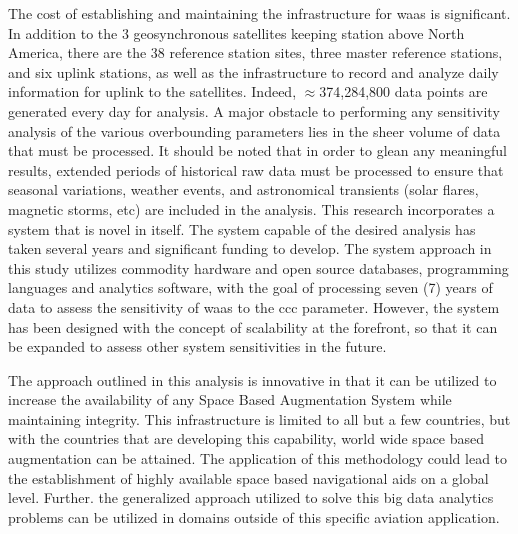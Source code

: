 The cost of establishing and maintaining the infrastructure for \ac{waas} is significant.  In addition to the 3 geosynchronous satellites keeping station above North America, there are the 38 reference station sites, three master reference stations, and six uplink stations, as well as the infrastructure to record and analyze daily information for uplink to the satellites.  Indeed, $\approx$374,284,800 data points are generated every day for analysis.  A major obstacle to performing any sensitivity analysis of the various overbounding parameters lies in the sheer volume of data that must be processed.  It should be noted that in order to glean any meaningful results, extended periods of historical raw data must be processed to ensure that seasonal variations, weather events, and astronomical transients (solar flares, magnetic storms, etc) are included in the analysis.  This research incorporates a system that is novel in itself.  The system capable of the desired analysis has taken several years and significant funding to develop. The system approach in this study utilizes commodity hardware and open source databases, programming languages and analytics software, with the goal of processing seven (7) years of data to assess the sensitivity of \ac{waas} to the \ac{ccc} parameter.  However, the system has been designed with the concept of scalability at the forefront, so that it can be expanded to assess other system sensitivities in the future.


The approach outlined in this analysis is innovative in that it can be utilized to increase the availability of any Space Based Augmentation System while maintaining integrity.  This infrastructure is limited to all but a few countries, but with the countries that are developing this capability, world wide space based augmentation can be attained. The application of this methodology could lead to the establishment of highly available space based navigational aids on a global level. Further. the generalized approach utilized to solve this big data analytics problems can be utilized in domains outside of this specific aviation application.

